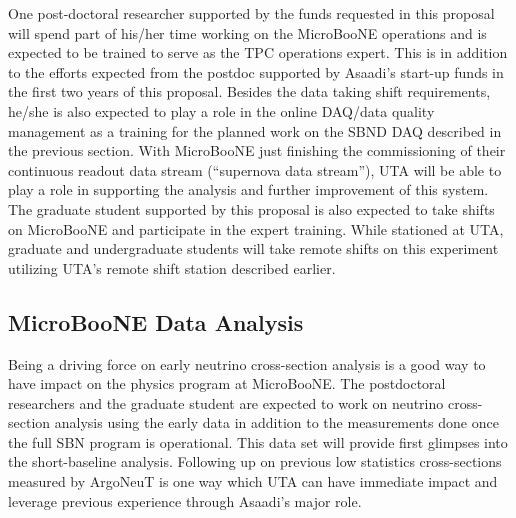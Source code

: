 One post-doctoral researcher supported by the funds requested in this proposal will spend part of his/her time working on the MicroBooNE operations and is expected to be trained to serve as the TPC operations expert. This is in addition to the efforts expected from the postdoc supported by Asaadi's start-up funds in the first two years of this proposal.  Besides the data taking shift requirements, he/she is also expected to play a role in the online DAQ/data quality management as a training for the planned work on the SBND DAQ described in the previous section. With MicroBooNE just finishing the commissioning of their continuous readout data stream (``supernova data stream''), UTA will be able to play a role in supporting the analysis and further improvement of this system. The graduate student supported by this proposal is also expected to take shifts on MicroBooNE and participate in the expert training. While stationed at UTA, graduate and undergraduate students will take remote shifts on this experiment utilizing UTA's remote shift station described earlier. 


\subsection{MicroBooNE Data Analysis}\label{sec:UbooneDataAnalysis}
Being a driving force on early neutrino cross-section analysis is a good way to have impact on the physics program at MicroBooNE. The postdoctoral researchers and the graduate student are expected to work on neutrino cross-section analysis using the early data in addition to the measurements done once the full SBN program is operational. This data set will provide first glimpses into the short-baseline analysis. Following up on previous low statistics cross-sections measured by ArgoNeuT is one way which UTA can have immediate impact and leverage previous experience through Asaadi's major role. 


